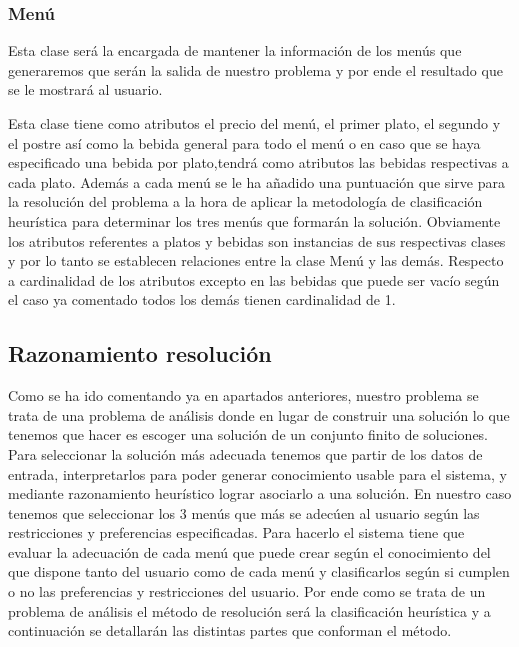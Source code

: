 \documentclass{article}
\begin{document}
\subsubsection{Menú}
Esta clase será la encargada de mantener la información de los menús que generaremos que serán la salida de nuestro problema y por ende el resultado que se le mostrará al usuario.
\par
Esta clase tiene como atributos el precio del menú, el primer plato, el segundo y el postre así como la bebida general para todo el menú o en caso que se haya especificado una bebida por plato,tendrá como atributos las bebidas respectivas a cada plato. Además a cada menú se le ha añadido una puntuación que sirve para la resolución del problema a la hora de aplicar la metodología de clasificación heurística para determinar los tres menús que formarán la solución.
Obviamente los atributos referentes a platos y bebidas son instancias de sus respectivas clases y por lo tanto se establecen relaciones entre la clase Menú y las demás.
Respecto a cardinalidad de los atributos excepto en las bebidas que puede ser vacío según el caso ya comentado todos los demás tienen cardinalidad de 1.

\subsection{Razonamiento resolución}
Como se ha ido comentando ya en apartados anteriores, nuestro problema se trata de una problema de análisis donde en lugar de construir una solución lo que tenemos que hacer es escoger una solución de un conjunto finito de soluciones. Para seleccionar la solución más adecuada tenemos que partir de los datos de entrada, interpretarlos para poder generar conocimiento usable para el sistema, y mediante razonamiento heurístico lograr asociarlo a una solución. En nuestro caso tenemos que seleccionar los 3 menús que más se adecúen al usuario según las restricciones y preferencias especificadas. Para hacerlo el sistema tiene que evaluar la adecuación de cada menú que puede crear según el conocimiento del que dispone tanto del usuario como de cada menú y clasificarlos según si cumplen o no las preferencias y restricciones del usuario.
Por ende como se trata de un problema de análisis el método de resolución será la clasificación heurística y a continuación se detallarán las distintas partes que conforman el método.
\par
\end{document}
